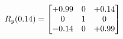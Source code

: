 \documentclass[preview]{standalone}
\begin{document}
\begin{align*}
\special{dvisvgm:raw <g id='unique000'>}R_{y}(0.14) = \begin{bmatrix}+0.99 & 0 & +0.14 \\0 & 1 & 0 \\-0.14 & 0 & +0.99\end{bmatrix}\special{dvisvgm:raw </g>}
\end{align*}
\end{document}
